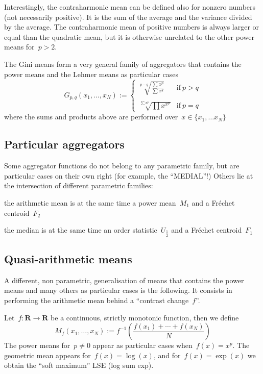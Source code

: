 \documentclass[a4paper]{article}
\def\R{\mathbf{R}}
\begin{document}
\medskip

Interestingly, the contraharmonic mean can be defined also for
nonzero numbers (not necessarily positive).
It is the sum of the average and the variance divided by the average.
The contraharmonic mean of positive numbers is always larger or
equal than the quadratic mean, but it is otherwise unrelated to the
other power means for~$p>2$.

The Gini means form a very general family of aggregators that
contains the power means and the Lehmer means as particular cases
\[
	G_{p,q}(x_1,\ldots,x_N) :=
	\begin{cases}
		\sqrt[p-q]{\displaystyle\frac{\sum x^p}{\sum x^q}}
		& \textrm{if}\ p>q \\
		&\\
		\sqrt[\sum x^p]{\prod x^{x^p}}
		& \textrm{if}\ p=q
	\end{cases}
\]
where the sums and products above are performed over~$x\in\{x_1,\ldots
x_N\}$

\subsection{Particular aggregators}

Some aggregator functions do not belong to any parametric family, but
are particular cases on their own right
(for example, the ``MEDIAL''!) Others lie at the
intersection of different parametric families:

the arithmetic mean is at the same time a power mean~$M_1$ and a
Fréchet centroid~$F_2$

the median is at the same time an order statistic~$U_{\frac{1}{2}}$ and a
Fréchet centroid~$F_1$


\subsection{Quasi-arithmetic means}

A different, non parametric, generalisation of means that contains
the power means and many others as particular cases is the following.
It consists in performing the arithmetic mean behind a ``contrast
change~$f$''.

Let~$f:\R\to\R$ be a continuous, strictly monotonic function, then we
define
\[
	M_f(x_1,\ldots,x_N):=f^{-1}\left(\frac{f(x_1)+\cdots+f(x_N)}{N}\right)
\]
The power means for~$p\neq0$  appear as particular cases
when~$f(x)=x^p$.  The geometric mean appears for~$f(x)=\log(x)$, and
for~$f(x)=\exp(x)$ we obtain the ``soft maximum'' LSE (log sum exp).
\end{document}
